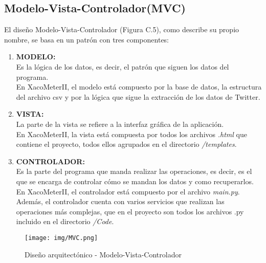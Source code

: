 \subsection{Modelo-Vista-Controlador(MVC)}
El diseño Modelo-Vista-Controlador (Figura C.5), como describe su propio nombre, se basa en un patrón con tres componentes:
\begin{enumerate}
    \item \textbf{MODELO:}\\
    Es la lógica de los datos, es decir, el patrón que siguen los datos del programa.\\
    En XacoMeterII, el modelo está compuesto por la base de datos, la estructura del archivo csv y por la lógica que sigue la extracción de los datos de Twitter. 
    
    \item \textbf{VISTA:}\\
    La parte de la vista se refiere a la interfaz gráfica de la aplicación. \\
    En XacoMeterII, la vista está compuesta por todos los archivos \textit{.html} que contiene el proyecto, todos ellos agrupados en el directorio \textit{/templates}.
    
    \item \textbf{CONTROLADOR:}\\
    Es la parte del programa que manda realizar las operaciones, es decir, es el que se encarga de controlar cómo se mandan los datos y como recuperarlos. \\
    En XacoMeterII, el controlador está compuesto por el archivo \textit{main.py}.
    Además, el controlador cuenta con varios servicios que realizan las operaciones más complejas, que en el proyecto son todos los archivos .py incluido en el directorio \textit{/Code}.

\end{enumerate}

\begin{figure}[h!]
    \centering
    \texttt{[image: img/MVC.png]} \\
    \caption{Diseño arquitectónico - Modelo-Vista-Controlador}
    \label{Diseño arquitectónico - Modelo-Vista-Controlador}
\end{figure}

